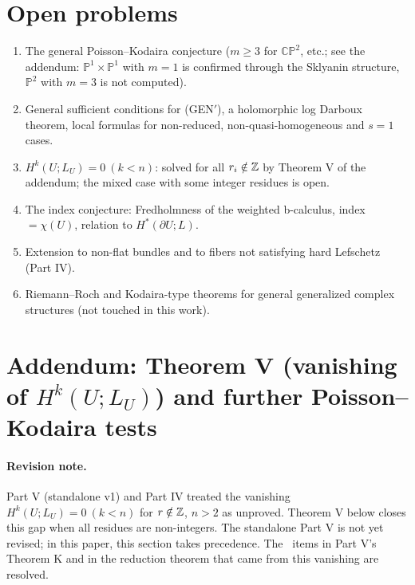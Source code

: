\section{Open problems}
\begin{enumerate}
\item The general Poisson--Kodaira conjecture ($m\ge3$ for $\mathbb{CP}^2$, etc.; see the addendum: $\mathbb P^1\times\mathbb P^1$ with $m=1$ is confirmed through the Sklyanin structure, $\mathbb P^2$ with $m=3$ is not computed).
\item General sufficient conditions for (GEN$'$), a holomorphic log Darboux theorem, local formulas for non-reduced, non-quasi-homogeneous and $s=1$ cases.
\item $H^k(U;L_U)=0\ (k<n)$: solved for all $r_i\notin\mathbb Z$ by Theorem V of the addendum; the mixed case with some integer residues is open.
\item The index conjecture: Fredholmness of the weighted b-calculus, index $=\chi(U)$, relation to $H^*(\partial U;L)$.
\item Extension to non-flat bundles and to fibers not satisfying hard Lefschetz (Part IV).
\item Riemann--Roch and Kodaira-type theorems for general generalized complex structures (not touched in this work).
\end{enumerate}

\section{Addendum: Theorem V (vanishing of $H^k(U;L_U)$) and further Poisson--Kodaira tests}\label{sec:addendum}
\paragraph{Revision note.}Part V (standalone v1) and Part IV treated the vanishing $H^k(U;L_U)=0\ (k<n)$ for $r\notin\mathbb Z$, $n>2$ as unproved. Theorem V below closes this gap when all residues are non-integers. The standalone Part V is not yet revised; in this paper, this section takes precedence. The \tQ\ items in Part V's Theorem K and in the reduction theorem that came from this vanishing are resolved.

